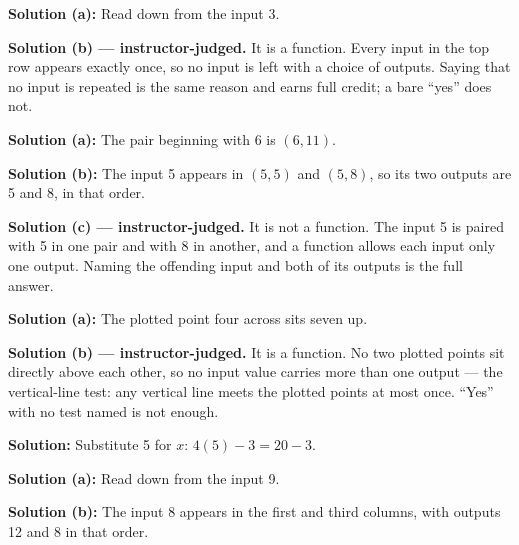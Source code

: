 \documentclass[12pt]{article}
\begin{document}




\textbf{Solution (a):} Read down from the input 3. 

\textbf{Solution (b) --- instructor-judged.} It is a function. Every input in
the top row appears exactly once, so no input is left with a choice of
outputs. Saying that no input is repeated is the same reason and earns full
credit; a bare ``yes'' does not.


\textbf{Solution (a):} The pair beginning with 6 is $(6, 11)$. 

\textbf{Solution (b):} The input 5 appears in $(5, 5)$ and $(5, 8)$, so its
two outputs are 5 and 8, in that order. 

\textbf{Solution (c) --- instructor-judged.} It is not a function. The input 5
is paired with 5 in one pair and with 8 in another, and a function allows each
input only one output. Naming the offending input and both of its outputs is
the full answer.


\textbf{Solution (a):} The plotted point four across sits seven up. 

\textbf{Solution (b) --- instructor-judged.} It is a function. No two plotted
points sit directly above each other, so no input value carries more than one
output --- the vertical-line test: any vertical line meets the plotted points
at most once. ``Yes'' with no test named is not enough.


\textbf{Solution:} Substitute 5 for $x$: $4(5) - 3 = 20 - 3$. 


\textbf{Solution (a):} Read down from the input 9. 

\textbf{Solution (b):} The input 8 appears in the first and third columns,
with outputs 12 and 8 in that order. 
\end{document}
